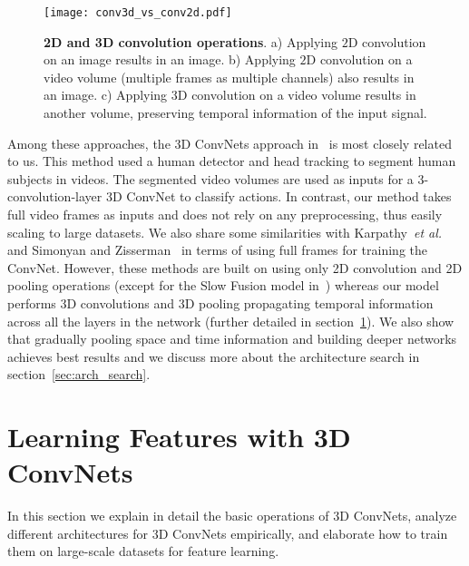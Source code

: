 \documentclass[10pt,twocolumn,letterpaper]{article}
\begin{document}
\begin{figure*}[t]
\begin{center}
   \texttt{[image: conv3d\_vs\_conv2d.pdf]}
\end{center}
\vspace{-12pt}
   \caption{{\bf 2D and 3D convolution operations}. a) Applying $2$D convolution on an image results in an image. b) Applying $2$D convolution on a video volume (multiple frames as multiple channels) also results in an image. c) Applying $3$D convolution on a video volume results in another volume, preserving temporal information of the input signal.}
\label{fig:conv3d_vs_conv2d}
\vspace{-12pt}
\end{figure*}


Among these approaches, the $3$D ConvNets approach in~\cite{Ming2013} is most closely related to us. This method used a human detector and head tracking to segment human subjects in videos. The segmented video volumes are used as inputs for a 3-convolution-layer 3D ConvNet to classify actions. In contrast, our method takes full video frames as inputs and does not rely on any preprocessing, thus easily scaling to large datasets. We also share some similarities with Karpathy~\emph{et al.}~\cite{Karpathy14} and Simonyan and Zisserman~\cite{SimonyanZ14} in terms of using full frames for training the ConvNet. However, these methods are built on using only 2D convolution and 2D pooling operations (except for the Slow Fusion model in~\cite{Karpathy14}) whereas our model performs 3D convolutions and 3D pooling propagating temporal information across all the layers in the network (further detailed in section~\ref{sec:learning_features}). We also show that gradually pooling space and time information and building deeper networks achieves best results and we discuss more about the architecture search in section~\ref{sec:arch_search}. 

\section{Learning Features with 3D ConvNets}
\label{sec:learning_features}
In this section we explain in detail the basic operations of 3D ConvNets, analyze different architectures for 3D ConvNets empirically, and elaborate how to train them on large-scale datasets for feature learning. 
\end{document}
